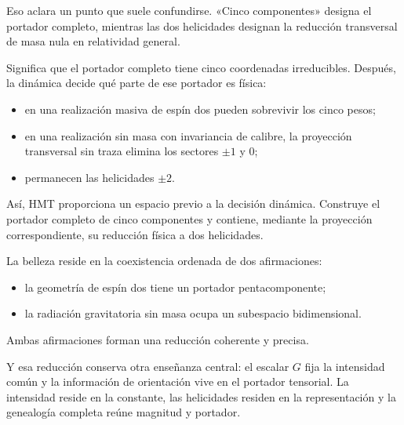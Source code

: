 Eso aclara un punto que suele confundirse. «Cinco componentes» designa el portador completo, mientras las dos helicidades designan la reducción transversal de masa nula en relatividad general.\par

Significa que el portador completo tiene cinco coordenadas irreducibles. Después, la dinámica decide qué parte de ese portador es física:\par

\begin{itemize}[leftmargin=*,itemsep=0.35em]
\item en una realización masiva de espín dos pueden sobrevivir los cinco pesos;
\item en una realización sin masa con invariancia de calibre, la proyección transversal sin traza elimina los sectores \(\pm1\) y \(0\);
\item permanecen las helicidades \(\pm2\).
\end{itemize}

Así, HMT proporciona un espacio previo a la decisión dinámica. Construye el portador completo de cinco componentes y contiene, mediante la proyección correspondiente, su reducción física a dos helicidades.\par

La belleza reside en la coexistencia ordenada de dos afirmaciones:\par

\begin{itemize}[leftmargin=*,itemsep=0.35em]
\item la geometría de espín dos tiene un portador pentacomponente;
\item la radiación gravitatoria sin masa ocupa un subespacio bidimensional.
\end{itemize}

Ambas afirmaciones forman una reducción coherente y precisa.\par

Y esa reducción conserva otra enseñanza central: el escalar \(G\) fija la intensidad común y la información de orientación vive en el portador tensorial. La intensidad reside en la constante, las helicidades residen en la representación y la genealogía completa reúne magnitud y portador.\par

